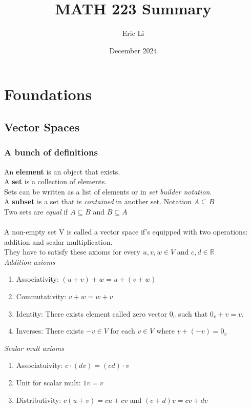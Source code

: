 \documentclass{article}
\title{MATH 223 Summary}
\author{Eric Li}
\date{December 2024}
\begin{document}
\maketitle
\section{Foundations}
\subsection{Vector Spaces}
\subsubsection{A bunch of definitions}
An \textbf{element} is  an object that exists.\\
A \textbf{set} is a collection of elements.\\
Sets can be written as a list of elements or in \textit{set builder notation}.\\
A \textbf{subset} is a set that is\textit{ contained} in another set. Notation $A \subseteq B$\\
Two sets are \textit{equal} if $A\subseteq B$ and $B\subseteq A$
\\\\
A non-empty set V is called a vector space if's equipped with two operations: addition and scalar multiplication.\\
They have to satisfy these axioms for every $u,v,w\in V$ and $c,d\in\mathds{R}$\\
\textit{Addition axioms}
\begin{enumerate}
    \item Associativity: $(u+v)+w = u+(v+w)$
    \item Commutativity: $v+w=w+v$
    \item Identity: There exists element called zero vector $0_v$ such that $0_v+v=v$.
    \item Inverses: There exists $-v\in V$ for each $v\in V$ where $v+(-v) = 0_v$
\end{enumerate}
\textit{Scalar mult axioms}
\begin{enumerate}
    \item Associatuivity: $c\cdot (dv) = (cd) \cdot v$
    \item Unit for scalar mult: $1v=v$
    \item Distributivity: $c(u+v)=cu+cv$ and $(c+d)v=cv+dv$
\end{enumerate}
\end{document}
